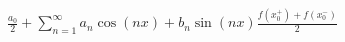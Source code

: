 \documentclass[preview]{standalone}
\begin{document}
\begin{center}
$\displaystyle{\frac{a_0}{2}+\sum\limits_{n=1}^{\infty}a_n\cos{(nx)}+b_n\sin{(nx)}\frac{f(x_0^+)+f(x_0^-)}{2}}$
\end{center}
\end{document}
